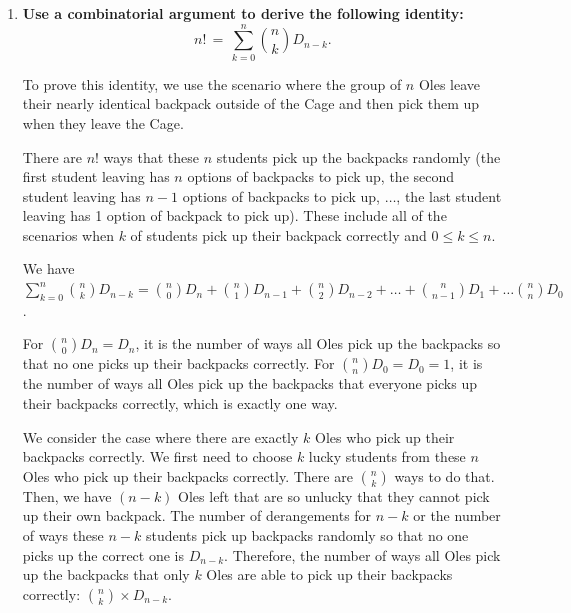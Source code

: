 \documentclass[10pt]{article}
\begin{document}
\begin{enumerate}
We start by putting one and only one rook on each row. Then for each rook, we need to decide on the column where we put it on. For the rook on the $i^{th}$ row, we cannot put it on the $i^{th}$ column since the $(i,i)$ square is always forbidden. Therefore, we can only consider the other columns besides the $i^{th}$ column. From this, we have the number of ways to place six non-attacking rooks on the chessboard, where an X represents a forbidden position, is the number of ways to place six rooks on the columns so that the index of the column is not equal to the index of the rook's row, and no two rooks are placed on the same column. This is also the number of derangements of $1, 2, \ldots, 6$ that for every $i \in \{1,2, \ldots, 6\}$, $i$ does not end up in the $i^{th}$  position ($D_6$).

Therefore, the number of ways to place six non-attacking rooks on the chessboard below, where an X represents a forbidden position: $D_6 = 6! \times \sum\limits_{k=0}^{6}\frac{(-1)^k}{k!} = 265$.

 pt

\item
\textbf{Use a combinatorial argument to derive the following identity:} 
$$n! \, = \, \displaystyle\sum\limits_{k=0}^{n} \binom{n}{k}D_{n-k}.$$

To prove this identity, we use the scenario where the group of $n$ Oles leave their nearly identical backpack outside of the Cage and then pick them up when they leave the Cage. 

There are $n!$ ways that these $n$ students pick up the backpacks randomly (the first student leaving has $n$ options of backpacks to pick up, the second student leaving has $n-1$ options of backpacks to pick up, $\ldots$, the last student leaving has 1 option of backpack to pick up). These include all of the scenarios when $k$ of students pick up their backpack correctly and $0 \leq k \leq n$. 

We have $\sum \limits_{k=0}^{n} \binom{n}{k}D_{n-k} = \binom{n}{0}D_n + \binom{n}{1}D_{n-1} + \binom{n}{2}D_{n-2} + \ldots + \binom{n}{n-1}D_{1} + \ldots \binom{n}{n}D_{0}$.

For $\binom{n}{0}D_n = D_n$, it is the number of ways all Oles pick up the backpacks so that no one picks up their backpacks correctly. For $\binom{n}{n}D_0 = D_0 = 1$, it is the number of ways all Oles pick up the backpacks that everyone picks up their backpacks correctly, which is exactly one way.

We consider the case where there are exactly $k$ Oles who pick up their backpacks correctly. We first need to choose $k$ lucky students from these $n$ Oles who pick up their backpacks correctly. There are $\binom{n}{k}$ ways to do that. Then, we have $(n-k)$ Oles left that are so unlucky that they cannot pick up their own backpack. The number of derangements for $n-k$ or the number of ways these $n-k$ students pick up backpacks randomly so that no one picks up the correct one is $D_{n-k}$. Therefore, the number of ways all Oles pick up the backpacks that only $k$ Oles are able to pick up their backpacks correctly: $\binom{n}{k} \times D_{n-k}$.


\end{enumerate}
\end{document}
